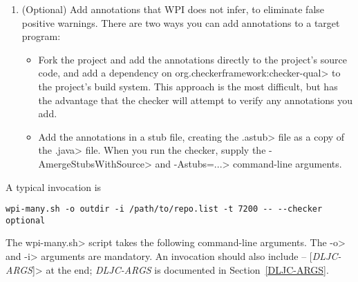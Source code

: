 \begin{enumerate}
\item (Optional) Add annotations that WPI does not infer, to eliminate
  false positive warnings. There are two ways you can add annotations to a target
  program:
  \begin{itemize}
  \item
    Fork the project and add the annotations directly to the project's
    source code, and add a dependency on
    \<org.checkerframework:checker-qual> to the project's build
    system. This approach is the most difficult, but has the advantage that
    the checker will attempt to verify any annotations you add.
  \item Add the annotations in a stub file, creating the \<.astub> file as
    a copy of the \<.java> file.  When you run the checker, supply the
    \<-AmergeStubsWithSource> and \<-Astubs=...> command-line arguments.
  \end{itemize}

\end{enumerate}

A typical invocation is

\begin{Verbatim}
wpi-many.sh -o outdir -i /path/to/repo.list -t 7200 -- --checker optional
\end{Verbatim}

The \<wpi-many.sh> script takes the following command-line arguments.
The \<-o> and \<-i> arguments are mandatory.
An invocation should also include \<-- [\emph{DLJC-ARGS}]> at the end;
\emph{DLJC-ARGS} is documented in Section~\ref{DLJC-ARGS}.


